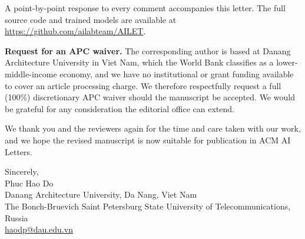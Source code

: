 \documentclass[11pt]{article}
\begin{document}
A point-by-point response to every comment accompanies this letter. The full source
code and trained models are available at
\url{https://github.com/ailabteam/AILET}.

\bigskip
\noindent\textbf{Request for an APC waiver.} The corresponding author is based at
Danang Architecture University in Viet Nam, which the World Bank classifies as a
lower-middle-income economy, and we have no institutional or grant funding
available to cover an article processing charge. We therefore respectfully request
a full (100\%) discretionary APC waiver should the manuscript be accepted. We would
be grateful for any consideration the editorial office can extend.

\bigskip
\noindent We thank you and the reviewers again for the time and care taken with our
work, and we hope the revised manuscript is now suitable for publication in ACM AI
Letters.

\bigskip
\noindent Sincerely,\\[0.5em]
Phuc Hao Do\\
Danang Architecture University, Da Nang, Viet Nam\\
The Bonch-Bruevich Saint Petersburg State University of Telecommunications, Russia\\
\href{mailto:haodp@dau.edu.vn}{haodp@dau.edu.vn}
\end{document}
